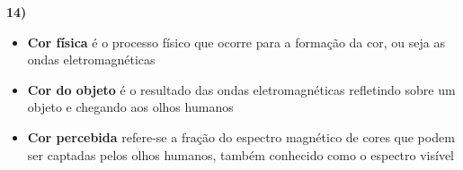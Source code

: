 \textbf{14)} 

\begin{itemize}
	\item \textbf{Cor física} é o processo físico que ocorre para a 
	formação da cor, ou seja as ondas eletromagnéticas
	
	\item \textbf{Cor do objeto} é o resultado das ondas eletromagnéticas 
	refletindo sobre um objeto e chegando aos olhos humanos
	
	\item \textbf{Cor percebida} refere-se a fração do espectro magnético de
	cores que podem ser captadas pelos olhos humanos, também conhecido como 
	o espectro visível
\end{itemize}